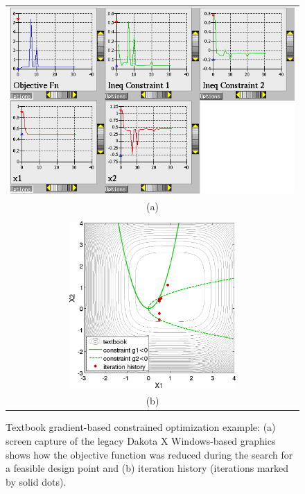 \begin{figure}[ht!]
  \centering
  \begin{tabular}{c}
  \includegraphics[width=\textwidth]{images/textbook_opt_hist}\\
  (a)\\
  \qquad\\
  \includegraphics[height=2.5in]{images/textbook_history} \\
  (b)
  \end{tabular}
  \caption{Textbook gradient-based constrained optimization example:
    (a) screen capture of the legacy Dakota X Windows-based graphics
    shows how the objective function was reduced during the search for
    a feasible design point and (b) iteration history (iterations
    marked by solid dots).}
  \label{additional:textbook_grad_constr_graphics}
\end{figure}

